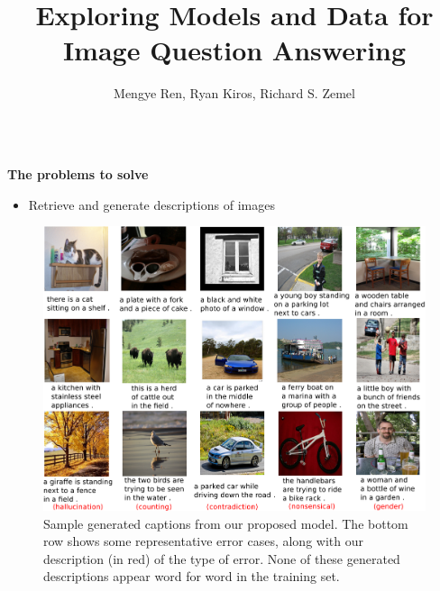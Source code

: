 \documentclass[serif,mathserif,final]{beamer}
\title{\huge{Exploring Models and Data for Image Question Answering}}
\author{Mengye Ren, Ryan Kiros, Richard S. Zemel}
\institute{University of Toronto}
\begin{document}
\begin{frame}{}
\begin{columns}[t]

\begin{column}{0.32\linewidth}
\minipage[c][0.9\textheight][s]{\columnwidth}
\vfill

\begin{block}{\bf{\large The problems to solve}}
	\begin{itemize}
	  \item Retrieve and generate descriptions of images
	\end{itemize}
  \begin{figure}[t!]
    \vspace{-0.1in}
    \centering
    \includegraphics[width=0.85\columnwidth]{caption_results.pdf}
    \vspace{-0.1in}
    \caption{Sample generated captions from our proposed model.
    The bottom row shows some representative error cases, along with our
    description (in red) of the type of error. None of these generated
    descriptions appear word for word in the training set.} 
    \label{fig:annot}
  \end{figure}
\end{block}
\vfill


\end{column}
\end{columns}
\end{frame}
\end{document}

